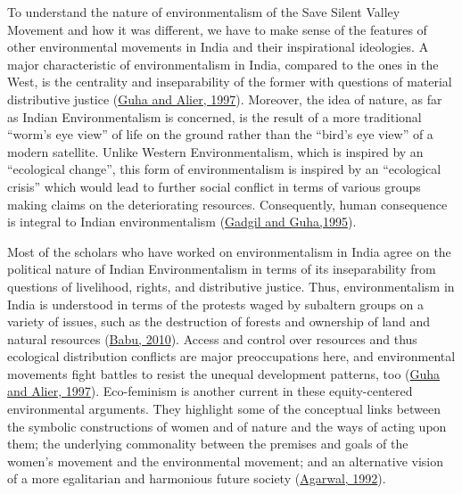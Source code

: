 \documentclass[twoside, 13pt]{article}
\begin{document}
{\fontsize{12}{14}\selectfont To understand the nature of environmentalism of the Save Silent Valley Movement and how it was different, we have to make sense of the features of other environmental movements in India and their inspirational ideologies. A major characteristic of environmentalism in India, compared to the ones in the West, is the centrality and inseparability of the former with questions of material distributive justice (\underline{Guha and Alier, 1997}). Moreover, the idea of nature, as far as Indian Environmentalism is concerned, is the result of a more traditional “worm’s eye view” of life on the ground rather than the “bird’s eye view” of a modern satellite. Unlike Western Environmentalism, which is inspired by an “ecological change”, this form of environmentalism is inspired by an “ecological crisis” which would lead to further social conflict in terms of various groups making claims on the deteriorating resources. Consequently, human consequence is integral to Indian environmentalism (\underline{Gadgil and Guha,1995}). 

Most of the scholars who have worked on environmentalism in India agree on the political nature of Indian Environmentalism in terms of its inseparability from questions of livelihood, rights, and distributive justice. Thus, environmentalism in India is understood in terms of the protests waged by subaltern groups on a variety of issues, such as the destruction of forests and ownership of land and natural resources (\underline{Babu, 2010}). Access and control over resources and thus ecological distribution conflicts are major preoccupations here, and environmental movements fight battles to resist the unequal development patterns, too (\underline{Guha and Alier, 1997}). Eco-feminism is another current in these equity-centered environmental arguments. They highlight some of the conceptual links between the symbolic constructions of women and of nature and the ways of acting upon them; the underlying commonality between the premises and goals of the women's movement and the environmental movement; and an alternative vision of a more egalitarian and harmonious future society (\underline{Agarwal, 1992}).


}
\end{document}
